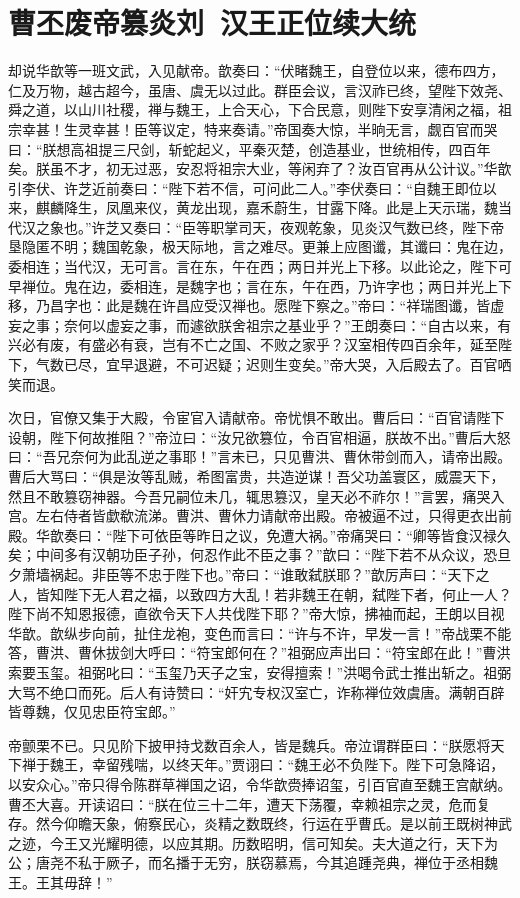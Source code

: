 \chapter{曹丕废帝篡炎刘~汉王正位续大统}

却说华歆等一班文武，入见献帝。歆奏曰：“伏睹魏王，自登位以来，德布四方，仁及万物，越古超今，虽唐、虞无以过此。群臣会议，言汉祚已终，望陛下效尧、舜之道，以山川社稷，禅与魏王，上合天心，下合民意，则陛下安享清闲之福，祖宗幸甚！生灵幸甚！臣等议定，特来奏请。”帝国奏大惊，半晌无言，觑百官而哭曰：“朕想高祖提三尺剑，斩蛇起义，平秦灭楚，创造基业，世统相传，四百年矣。朕虽不才，初无过恶，安忍将祖宗大业，等闲弃了？汝百官再从公计议。”华歆引李伏、许芝近前奏曰：“陛下若不信，可问此二人。”李伏奏曰：“自魏王即位以来，麒麟降生，凤凰来仪，黄龙出现，嘉禾蔚生，甘露下降。此是上天示瑞，魏当代汉之象也。”许芝又奏曰：“臣等职掌司天，夜观乾象，见炎汉气数已终，陛下帝垦隐匿不明；魏国乾象，极天际地，言之难尽。更兼上应图谶，其谶曰：鬼在边，委相连；当代汉，无可言。言在东，午在西；两日并光上下移。以此论之，陛下可早禅位。鬼在边，委相连，是魏字也；言在东，午在西，乃许字也；两日并光上下移，乃昌字也：此是魏在许昌应受汉禅也。愿陛下察之。”帝曰：“祥瑞图谶，皆虚妄之事；奈何以虚妄之事，而遽欲朕舍祖宗之基业乎？”王朗奏曰：“自古以来，有兴必有废，有盛必有衰，岂有不亡之国、不败之家乎？汉室相传四百余年，延至陛下，气数已尽，宜早退避，不可迟疑；迟则生变矣。”帝大哭，入后殿去了。百官哂笑而退。

次日，官僚又集于大殿，令宦官入请献帝。帝忧惧不敢出。曹后曰：“百官请陛下设朝，陛下何故推阻？”帝泣曰：“汝兄欲篡位，令百官相逼，朕故不出。”曹后大怒曰：“吾兄奈何为此乱逆之事耶！”言未已，只见曹洪、曹休带剑而入，请帝出殿。曹后大骂曰：“俱是汝等乱贼，希图富贵，共造逆谋！吾父功盖寰区，威震天下，然且不敢篡窃神器。今吾兄嗣位未几，辄思篡汉，皇天必不祚尔！”言罢，痛哭入宫。左右侍者皆歔欷流涕。曹洪、曹休力请献帝出殿。帝被逼不过，只得更衣出前殿。华歆奏曰：“陛下可依臣等昨日之议，免遭大祸。”帝痛哭曰：“卿等皆食汉禄久矣；中间多有汉朝功臣子孙，何忍作此不臣之事？”歆曰：“陛下若不从众议，恐旦夕萧墙祸起。非臣等不忠于陛下也。”帝曰：“谁敢弑朕耶？”歆厉声曰：“天下之人，皆知陛下无人君之福，以致四方大乱！若非魏王在朝，弑陛下者，何止一人？陛下尚不知恩报德，直欲令天下人共伐陛下耶？”帝大惊，拂袖而起，王朗以目视华歆。歆纵步向前，扯住龙袍，变色而言曰：“许与不许，早发一言！”帝战栗不能答，曹洪、曹休拔剑大呼曰：“符宝郎何在？”祖弼应声出曰：“符宝郎在此！”曹洪索要玉玺。祖弼叱曰：“玉玺乃天子之宝，安得擅索！”洪喝令武士推出斩之。祖弼大骂不绝口而死。后人有诗赞曰：“奸宄专权汉室亡，诈称禅位效虞唐。满朝百辟皆尊魏，仅见忠臣符宝郎。”

帝颤栗不已。只见阶下披甲持戈数百余人，皆是魏兵。帝泣谓群臣曰：“朕愿将天下禅于魏王，幸留残喘，以终天年。”贾诩曰：“魏王必不负陛下。陛下可急降诏，以安众心。”帝只得令陈群草禅国之诏，令华歆赍捧诏玺，引百官直至魏王宫献纳。曹丕大喜。开读诏曰：“朕在位三十二年，遭天下荡覆，幸赖祖宗之灵，危而复存。然今仰瞻天象，俯察民心，炎精之数既终，行运在乎曹氏。是以前王既树神武之迹，今王又光耀明德，以应其期。历数昭明，信可知矣。夫大道之行，天下为公；唐尧不私于厥子，而名播于无穷，朕窃慕焉，今其追踵尧典，禅位于丞相魏王。王其毋辞！”

